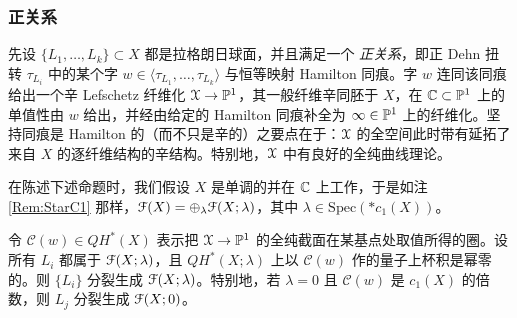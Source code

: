 \subsubsection{正关系}

先设 $\{L_1,\ldots, L_k\} \subset X$ 都是拉格朗日球面，并且满足一个 \emph{正关系}，即正 Dehn 扭转 $\tau_{L_i}$ 中的某个字 $w \in \langle \tau_{L_1}, \ldots, \tau_{L_k}\rangle$ 与恒等映射 Hamilton 同痕。字 $w$ 连同该同痕给出一个辛 Lefschetz 纤维化 $\EuScript{X} \rightarrow \mathbb{P}^1$，其一般纤维辛同胚于 $X$，在 $\mathbb{C} \subset \mathbb{P}^1$ 上的单值性由 $w$ 给出，并经由给定的 Hamilton 同痕补全为 $\infty \in \mathbb{P}^1$ 上的纤维化。坚持同痕是 Hamilton 的（而不只是辛的）之要点在于：$\EuScript{X}$ 的全空间此时带有延拓了来自 $X$ 的逐纤维结构的辛结构。特别地，$\EuScript{X}$ 中有良好的全纯曲线理论。

在陈述下述命题时，我们假设 $X$ 是单调的并在 $\mathbb{C}$ 上工作，于是如注 \ref{Rem:StarC1} 那样，$\EuScript{F}(X) = \oplus_{\lambda} \EuScript{F}(X;\lambda)$，其中 $\lambda \in \mathrm{Spec}(\ast c_1(X))$。

\begin{Proposition} \label{Prop:SpheresGenerate}
令 $\mathcal{C}(w) \in QH^*(X)$ 表示把 $\EuScript{X}\rightarrow \mathbb{P}^1$ 的全纯截面在某基点处取值所得的圈。设所有 $L_i$ 都属于 $\EuScript{F}(X; \lambda)$，且 $QH^*(X;\lambda) $ 上以 $\mathcal{C}(w)$ 作的量子上杯积是幂零的。则 $\{L_i\}$ 分裂生成 $\EuScript{F}(X;\lambda)$。特别地，若 $\lambda =0$ 且 $\mathcal{C}(w)$ 是 $c_1(X)$ 的倍数，则 $L_j$ 分裂生成 $\EuScript{F}(X;0)$。
\end{Proposition}

